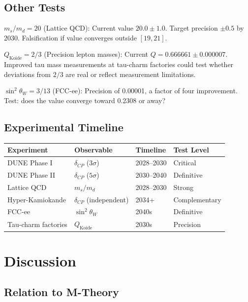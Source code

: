 \documentclass[11pt,a4paper]{article}
\newcommand{\CP}{\mathrm{CP}}
\def\CP{CP}%
\begin{document}
\subsection{Other Tests}

\textbf{$m_s/m_d = 20$} (Lattice QCD): Current value $20.0 \pm 1.0$. Target precision $\pm 0.5$ by 2030. Falsification if value converges outside $[19, 21]$.

\textbf{$Q_{\mathrm{Koide}} = 2/3$} (Precision lepton masses): Current $Q = 0.666661 \pm 0.000007$. Improved tau mass measurements at tau-charm factories could test whether deviations from $2/3$ are real or reflect measurement limitations.

\textbf{$\sin^2\theta_W = 3/13$} (FCC-ee): Precision of 0.00001, a factor of four improvement. Test: does the value converge toward 0.2308 or away?

\subsection{Experimental Timeline}

\begin{table}[H]
\centering
\small
\begin{tabular}{llll}
\toprule
Experiment & Observable & Timeline & Test Level \\
\midrule
DUNE Phase I & $\delta_{\CP}$ ($3\sigma$) & 2028--2030 & Critical \\
DUNE Phase II & $\delta_{\CP}$ ($5\sigma$) & 2030--2040 & Definitive \\
Lattice QCD & $m_s/m_d$ & 2028--2030 & Strong \\
Hyper-Kamiokande & $\delta_{\CP}$ (independent) & 2034+ & Complementary \\
FCC-ee & $\sin^2\theta_W$ & 2040s & Definitive \\
Tau-charm factories & $Q_{\mathrm{Koide}}$ & 2030s & Precision \\
\bottomrule
\end{tabular}
\end{table}

\section{Discussion}

\subsection{Relation to M-Theory}
\end{document}
